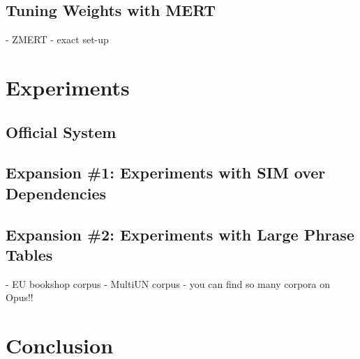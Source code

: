 \documentclass[11pt]{article}
\begin{document}
\subsection{Tuning Weights with MERT}
\label{sec:mert}

- ZMERT \cite{zaidan:zmert:09}
- exact set-up

\section{Experiments}
\label{sec:exp}

\subsection{Official System}
\label{sec:exp:official}

\cite{nltkbook}

\subsection{Expansion \#1: Experiments with SIM over Dependencies}
\label{sec:exp:sim}

\subsection{Expansion \#2: Experiments with Large Phrase Tables}
\label{sec:exp:large-pts}

- EU bookshop corpus
- MultiUN corpus
- you can find so many corpora on Opus!! \cite{tiedemann:12}

\section{Conclusion} 



\end{document}
